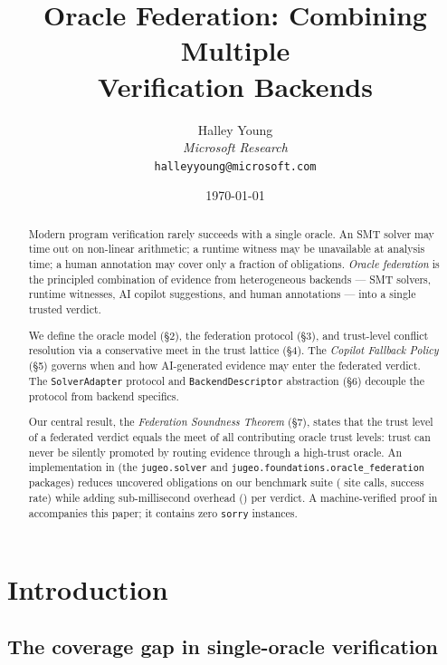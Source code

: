 \documentclass[11pt]{article}
\title{\textbf{Oracle Federation: Combining Multiple\\
       Verification Backends}}
\author{%
  Halley Young\\
  \textit{Microsoft Research}\\
  \texttt{halleyyoung@microsoft.com}
}
\date{\today}
\begin{document}
\maketitle

\begin{abstract}
Modern program verification rarely succeeds with a single oracle.  An SMT
solver may time out on non-linear arithmetic; a runtime witness may be
unavailable at analysis time; a human annotation may cover only a fraction
of obligations.  \emph{Oracle federation} is the principled combination of
evidence from heterogeneous backends — SMT solvers, runtime witnesses, AI
copilot suggestions, and human annotations — into a single trusted verdict.

We define the oracle model (§2), the federation protocol (§3), and
trust-level conflict resolution via a conservative meet in the trust
lattice (§4).  The \emph{Copilot Fallback Policy} (§5) governs when and
how AI-generated evidence may enter the federated verdict.  The
\texttt{SolverAdapter} protocol and \texttt{BackendDescriptor} abstraction
(§6) decouple the protocol from backend specifics.

Our central result, the \emph{Federation Soundness Theorem} (§7), states
that the trust level of a federated verdict equals the meet of all
contributing oracle trust levels: trust can never be silently promoted by
routing evidence through a high-trust oracle.  An implementation in
\Python{} (the \texttt{jugeo.solver} and
\texttt{jugeo.foundations.oracle\_federation} packages) reduces uncovered
obligations on our benchmark suite (\subSiteCalls{} site calls,
\subSiteSuccessRate{} success rate) while adding sub-millisecond overhead
(\subSiteMeanTime{}) per verdict.  A machine-verified proof in \LEAN{}
accompanies this paper; it contains zero \texttt{sorry} instances.
\end{abstract}

\newpage

\section{Introduction}\label{sec:intro}

\subsection{The coverage gap in single-oracle verification}
\end{document}
